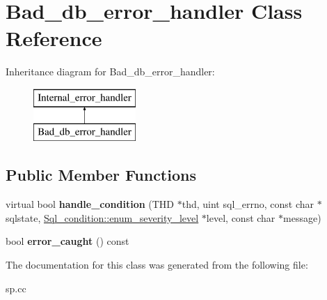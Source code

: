 \hypertarget{classBad__db__error__handler}{}\section{Bad\+\_\+db\+\_\+error\+\_\+handler Class Reference}
\label{classBad__db__error__handler}
Inheritance diagram for Bad\+\_\+db\+\_\+error\+\_\+handler\+:\begin{figure}[H]
\begin{center}
\leavevmode
\includegraphics[height=2.000000cm]{classBad__db__error__handler}
\end{center}
\end{figure}
\subsection*{Public Member Functions}
\begin{DoxyCompactItemize}
\item 
\mbox{\label{classBad__db__error__handler_ad0530dd2a7cfce820b7e1a3bd174812b}} 
virtual bool {\bfseries handle\+\_\+condition} (T\+HD $\ast$thd, uint sql\+\_\+errno, const char $\ast$sqlstate, \mbox{\hyperlink{classSql__condition_ab0602581e19cddb609bfe10c44be4e83}{Sql\+\_\+condition\+::enum\+\_\+severity\+\_\+level}} $\ast$level, const char $\ast$message)
\item 
\mbox{\label{classBad__db__error__handler_aa3dee64663e54a0a9f7160e5beaaa186}} 
bool {\bfseries error\+\_\+caught} () const
\end{DoxyCompactItemize}


The documentation for this class was generated from the following file\+:\begin{DoxyCompactItemize}
\item 
sp.\+cc\end{DoxyCompactItemize}
